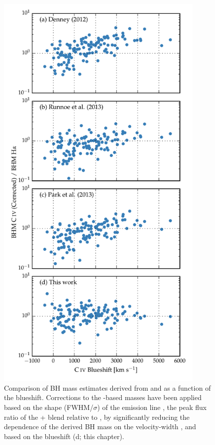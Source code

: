 \begin{figure}
    \includegraphics[width=0.9\textwidth]{figures/chapter03/corrections.pdf}  
    \caption[{Comparison of BH mass estimates derived from  and \ha as a function of the  blueshift.}]{Comparison of BH mass estimates derived from  and \ha as a function of the  blueshift. Corrections to the -based masses have been applied based on the shape (FWHM/$\sigma$) of the  emission line \citep[a;][]{denney12}, the peak flux ratio of the + blend relative to  \citep[b;][]{runnoe13}, by significantly reducing the dependence of the derived BH mass on the  velocity-width \citep[c;][]{park13}, and based on the  blueshift (d; this chapter).}
    \label{fig:compare_corrections}
\end{figure}

